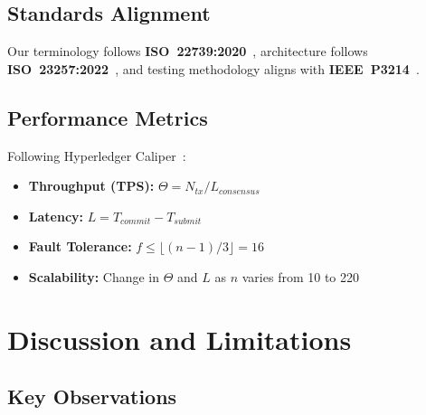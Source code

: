 \documentclass[10pt,twocolumn,letterpaper]{article}
\begin{document}
\subsection{Standards Alignment}

Our terminology follows \textbf{ISO~22739:2020}~\cite{iso22739}, architecture follows \textbf{ISO~23257:2022}~\cite{iso23257}, and testing methodology aligns with \textbf{IEEE~P3214}~\cite{ieeep3214}.

\subsection{Performance Metrics}

Following Hyperledger Caliper~\cite{caliper2023}:
\begin{itemize}[leftmargin=*]
    \item \textbf{Throughput (TPS):} $\Theta = N_{tx} / L_{consensus}$
    \item \textbf{Latency:} $L = T_{commit} - T_{submit}$
    \item \textbf{Fault Tolerance:} $f \leq \lfloor(n-1)/3\rfloor = 16$
    \item \textbf{Scalability:} Change in $\Theta$ and $L$ as $n$ varies from 10 to 220
\end{itemize}

\section{Discussion and Limitations}
\label{sec:discussion}

\subsection{Key Observations}
\end{document}
